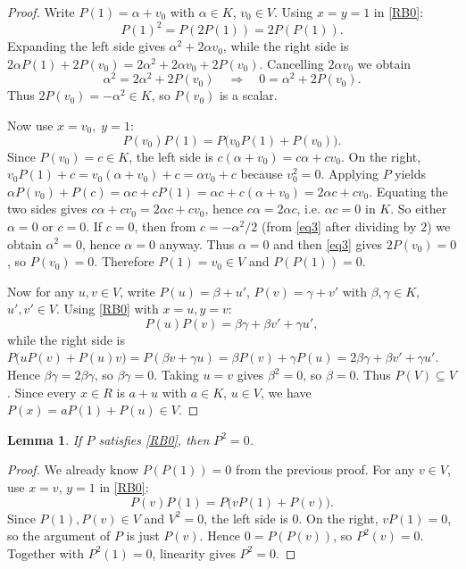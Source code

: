 \documentclass[a4paper,11pt]{elsarticle}
\newtheorem{lemma}[theorem]{Lemma}
\theoremstyle{definition}
\theoremstyle{remark}
\begin{document}
\begin{proof}
Write $P(1) = \alpha + v_0$ with $\alpha \in K$, $v_0 \in V$.
Using $x = y = 1$ in \eqref{RB0}:
\[
P(1)^2 = P(2P(1)) = 2P(P(1)).
\]
Expanding the left side gives $\alpha^2 + 2\alpha v_0$, while the right side is $2\alpha P(1) + 2P(v_0) = 2\alpha^2 + 2\alpha v_0 + 2P(v_0)$.
Cancelling $2\alpha v_0$ we obtain
\begin{equation}\label{eq3}
    \alpha^2 = 2\alpha^2 + 2P(v_0) \quad\Longrightarrow\quad 0 = \alpha^2 + 2P(v_0).
\end{equation}
Thus $2P(v_0) = -\alpha^2 \in K$, so $P(v_0)$ is a scalar.

Now use $x = v_0,\; y = 1$:
\[
P(v_0)P(1) = P\bigl(v_0 P(1) + P(v_0)\bigr).
\]
Since $P(v_0) = c \in K$, the left side is $c(\alpha + v_0) = c\alpha + c v_0$.
On the right, $v_0 P(1) + c = v_0(\alpha + v_0) + c = \alpha v_0 + c$ because $v_0^2=0$.
Applying $P$ yields $\alpha P(v_0) + P(c) = \alpha c + c P(1) = \alpha c + c(\alpha + v_0) = 2\alpha c + c v_0$.
Equating the two sides gives $c\alpha + c v_0 = 2\alpha c + c v_0$, hence $c\alpha = 2\alpha c$, i.e. $\alpha c = 0$ in $K$.
So either $\alpha = 0$ or $c = 0$.  If $c = 0$, then from $c = -\alpha^2/2$ (from \ref{eq3} after dividing by $2$) we obtain $\alpha^2 = 0$, hence $\alpha = 0$ anyway.
Thus $\alpha = 0$ and then \ref{eq3} gives $2P(v_0) = 0$, so $P(v_0) = 0$.
Therefore $P(1) = v_0 \in V$ and $P(P(1)) = 0$.

Now for any $u,v \in V$, write $P(u) = \beta + u'$, $P(v) = \gamma + v'$ with $\beta,\gamma \in K$, $u',v' \in V$.
Using \eqref{RB0} with $x = u, y = v$:
\[
P(u)P(v) = \beta\gamma + \beta v' + \gamma u',
\]
while the right side is $P\bigl(u P(v) + P(u) v\bigr) = P(\beta v + \gamma u) = \beta P(v) + \gamma P(u) = 2\beta\gamma + \beta v' + \gamma u'$.
Hence $\beta\gamma = 2\beta\gamma$, so $\beta\gamma = 0$.  Taking $u = v$ gives $\beta^2 = 0$, so $\beta = 0$.
Thus $P(V) \subseteq V$.
Since every $x \in R$ is $a + u$ with $a \in K$, $u \in V$, we have $P(x) = aP(1) + P(u) \in V$.
\end{proof}

\begin{lemma}\label{lem:P2zero}
If $P$ satisfies \eqref{RB0}, then $P^2 = 0$.
\end{lemma}

\begin{proof}
We already know $P(P(1)) = 0$ from the previous proof.  For any $v \in V$, use $x = v$, $y = 1$ in \eqref{RB0}:
\[
P(v)P(1) = P\bigl(v P(1) + P(v)\bigr).
\]
Since $P(1), P(v) \in V$ and $V^2 = 0$, the left side is $0$.  On the right, $v P(1) = 0$, so the argument of $P$ is just $P(v)$.  Hence $0 = P(P(v))$, so $P^2(v) = 0$.  Together with $P^2(1) = 0$, linearity gives $P^2 = 0$.
\end{proof}
\end{document}
